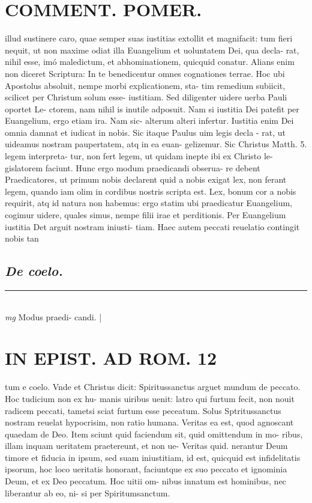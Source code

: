 \documentclass{article}
\begin{document}
\begin{pages}
\section*{COMMENT. POMER.  }\pstart illud sustinere caro, quae semper suas iustitias extollit et magnifacit: tum fieri nequit, ut non maxime odiat illa Euangelium et uoluntatem Dei, qua decla- rat, nihil esse, imó maledictum, et abhominationem, quicquid conatur. Alians enim non diceret Scriptura: In te benedicentur omnes cognationes terrae. Hoc ubi Apostolus absoluit, nempe morbi explicationem, sta- tim remedium subiicit, scilicet per Christum solum esse- iustitiam. Sed diligenter uidere uerba Pauli oportet Le- ctorem, nam nihil is inutile adposuit. Nam si iustitia Dei patefit per Euangelium, ergo etiam ira. Nam sic- alterum alteri infertur. Iustitia enim Dei omnia damnat et iudicat in nobis. Sic itaque Paulus uim legis decla - rat, ut uideamus nostram paupertatem, atq in ea euan- gelizemur. Sic Christus Matth. 5. legem interpreta- tur, non fert legem, ut quidam inepte ibi ex Christo le- gislatorem faciunt. Hunc ergo modum praedicandi obserua- re debent Praedicatores, ut primum nobis declarent quid a nobis exigat lex, non ferant legem, quando iam olim in cordibus nostris scripta est. Lex, bonum cor a nobis requirit, atq id natura non habemus: ergo statim ubi praedicatur Euangelium, cogimur uidere, quales simus, nempe filii irae et perditionis.   \pend\pstart Per Euangelium iustitia Det arguit nostram iniusti- tiam. Haec autem peccati reuelatio contingit nobis tan  \pend
{}
{}
\subsection*{\textit{De coelo. }}
\vspace{0.5cm}\noindent
\vspace{0.2cm}\rule{1cm}{0.2pt}\\ 
\hspace{0.2cm}\textit{mg}
\footnotesize Modus praedi- candi.  
\normalsize| 
\section*{IN EPIST. AD ROM.  12 }
\marginpar{[ p.]}\pstart tum e coelo. Vnde et Christus dicit: Spiritussanctus arguet mundum de peccato. Hoc tudicium non ex hu- manis uiribus uenit: latro qui furtum fecit, non nouit radicem peccati, tametsi sciat furtum esse peceatum.  Solus Sptritussanctus nostram reuelat hypocrisim, non ratio humana.   \pend\pstart Veritas ea est, quod agnoscant quaedam de Deo.  Item sciunt quid faciendum sit, quid omittendum in mo- ribus, illam inquam ueritatem praetereunt, et non ue- Veritas quid.  nerantur Deum timore et fiducia in ipsum, sed suam iniustitiam, id est, quicquid est infidelitatis ipsorum, hoc loco ueritatis honorant, faciuntque ex suo peccato et ignominia Deum, et ex Deo peccatum. Hoc uitii om- nibus innatum est hominibus, nec liberantur ab eo, ni- si per Spiritumsanctum.  \pend
{}
{}

\end{pages}
\end{document}
